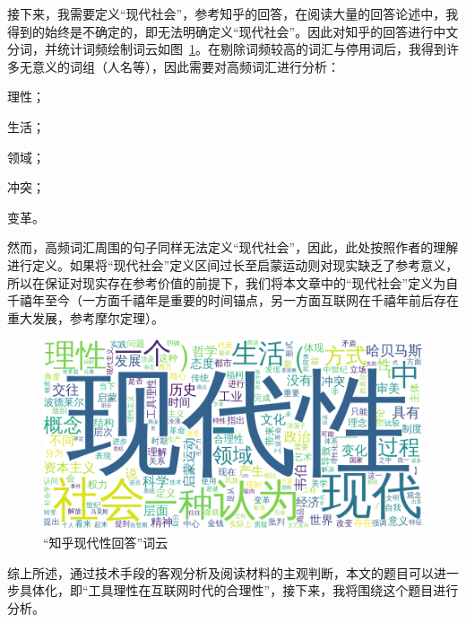 接下来，我需要定义“现代社会”，参考知乎\cite{liu2017现代性}的回答，在阅读大量的回答论述中，我得到的始终是不确定的，即无法明确定义“现代社会”。因此对知乎的回答进行中文分词\cite{sun2019jieba}，并统计词频绘制词云如图~\ref{F:2}。在剔除词频较高的词汇与停用词后，我得到许多无意义的词组（人名等），因此需要对高频词汇进行分析：
\begin{enumerate*}[label=(\alph*)]
    \item 理性；
    \item 生活；
    \item 领域；
    \item 冲突；
    \item 变革。
\end{enumerate*}
然而，高频词汇周围的句子同样无法定义“现代社会”，因此，此处按照作者的理解进行定义。如果将“现代社会”定义区间过长至启蒙运动则对现实缺乏了参考意义，所以在保证对现实存在参考价值的前提下，我们将本文章中的“现代社会”定义为自千禧年至今（一方面千禧年是重要的时间锚点，另一方面互联网在千禧年前后存在重大发展，参考摩尔定理）。
\begin{figure}[H]
    \centering
    \includegraphics[width=.8\textwidth]{wordcloud/现代性.png}
    \caption{“知乎现代性回答”词云}\label{F:2}
\end{figure}

综上所述，通过技术手段的客观分析及阅读材料的主观判断，本文的题目可以进一步具体化，即“工具理性在互联网时代的合理性”，接下来，我将围绕这个题目进行分析。
